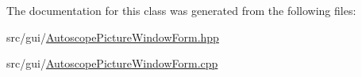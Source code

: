 The documentation for this class was generated from the following files\+:\begin{DoxyCompactItemize}
\item 
src/gui/\hyperlink{_autoscope_picture_window_form_8hpp}{Autoscope\+Picture\+Window\+Form.\+hpp}\item 
src/gui/\hyperlink{_autoscope_picture_window_form_8cpp}{Autoscope\+Picture\+Window\+Form.\+cpp}\end{DoxyCompactItemize}
